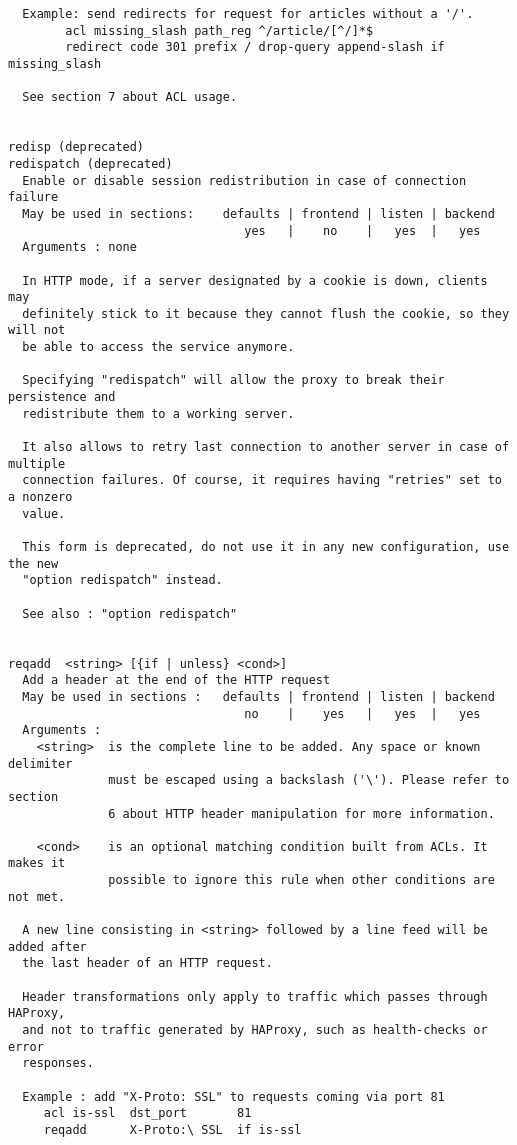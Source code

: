 \begin{verbatim}
  Example: send redirects for request for articles without a '/'.
        acl missing_slash path_reg ^/article/[^/]*$
        redirect code 301 prefix / drop-query append-slash if missing_slash

  See section 7 about ACL usage.


redisp (deprecated)
redispatch (deprecated)
  Enable or disable session redistribution in case of connection failure
  May be used in sections:    defaults | frontend | listen | backend
                                 yes   |    no    |   yes  |   yes
  Arguments : none

  In HTTP mode, if a server designated by a cookie is down, clients may
  definitely stick to it because they cannot flush the cookie, so they will not
  be able to access the service anymore.

  Specifying "redispatch" will allow the proxy to break their persistence and
  redistribute them to a working server.

  It also allows to retry last connection to another server in case of multiple
  connection failures. Of course, it requires having "retries" set to a nonzero
  value.

  This form is deprecated, do not use it in any new configuration, use the new
  "option redispatch" instead.

  See also : "option redispatch"


reqadd  <string> [{if | unless} <cond>]
  Add a header at the end of the HTTP request
  May be used in sections :   defaults | frontend | listen | backend
                                 no    |    yes   |   yes  |   yes
  Arguments :
    <string>  is the complete line to be added. Any space or known delimiter
              must be escaped using a backslash ('\'). Please refer to section
              6 about HTTP header manipulation for more information.

    <cond>    is an optional matching condition built from ACLs. It makes it
              possible to ignore this rule when other conditions are not met.

  A new line consisting in <string> followed by a line feed will be added after
  the last header of an HTTP request.

  Header transformations only apply to traffic which passes through HAProxy,
  and not to traffic generated by HAProxy, such as health-checks or error
  responses.

  Example : add "X-Proto: SSL" to requests coming via port 81
     acl is-ssl  dst_port       81
     reqadd      X-Proto:\ SSL  if is-ssl


\end{verbatim}
